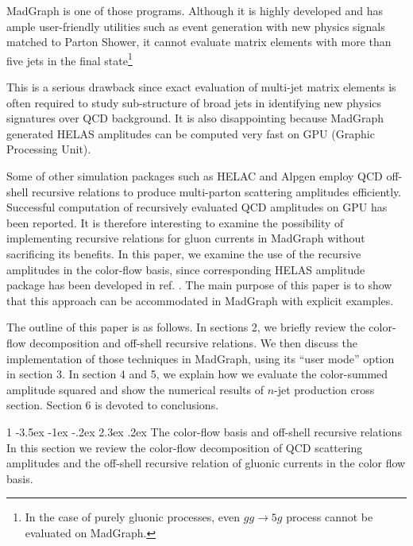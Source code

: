 \documentclass[a4paper,11pt]{article}
\makeatletter
\renewcommand{\section}{%
  \@startsection{section}%
   {1}%
   {\z@}%
   {-3.5ex \@plus -1ex \@minus -.2ex}%
   {2.3ex \@plus.2ex}%
   {\normalfont\large\bfseries}%
}%
\makeatother
\begin{document}
 MadGraph\cite{MG}
is one of those programs. Although it is highly developed and
has ample user-friendly utilities such as event generation with new physics signals
matched to Parton Shower\cite{MG/ME}, it cannot evaluate matrix
elements with more than five jets in the final state\footnote{In the case of
purely gluonic processes, even $gg\rightarrow 5g$ process cannot be
evaluated on MadGraph\cite{GPU2}.}\cite{GPU2}

This is a serious drawback since exact evaluation of multi-jet matrix
elements is often required to study sub-structure of broad jets in
identifying new physics signatures over QCD background. It is also
disappointing because MadGraph generated HELAS amplitudes\cite{HELAS}
can be computed very fast on GPU (Graphic Processing Unit)\cite{GPU1,GPU2}.

Some of other simulation packages such as HELAC and Alpgen\cite{HELAC,Alpgen} employ QCD off-shell recursive
relations to produce multi-parton scattering
amplitudes efficiently. Successful computation of recursively evaluated
QCD amplitudes on GPU has been reported\cite{giele2010}. It is therefore interesting to examine the
possibility of implementing recursive relations for gluon currents in MadGraph without
sacrificing its benefits. In this paper, we examine the use of the
recursive amplitudes in the color-flow basis, since corresponding HELAS
amplitude package has been developed in ref. \cite{fabio}. The main purpose of
this paper is to show that this approach can be accommodated in MadGraph
with explicit examples.

The outline of this paper is as follows. In sections 2, we briefly
review the color-flow decomposition and off-shell recursive relations.
We then discuss the implementation of those techniques in
MadGraph, using its ``user mode'' option\cite{MG/ME} in section 3. In
section 4 and 5, we explain how we evaluate the color-summed amplitude
squared and show the numerical results of $n$-jet production cross section.
Section 6 is devoted
to conclusions.

 \section{{\normalsize The color-flow basis and off-shell recursive
 relations}}
\label{review}
In this section we review the color-flow decomposition\cite{fabio} of QCD scattering amplitudes and the off-shell recursive relation\cite{berends} of gluonic currents in the color flow basis.
\end{document}
